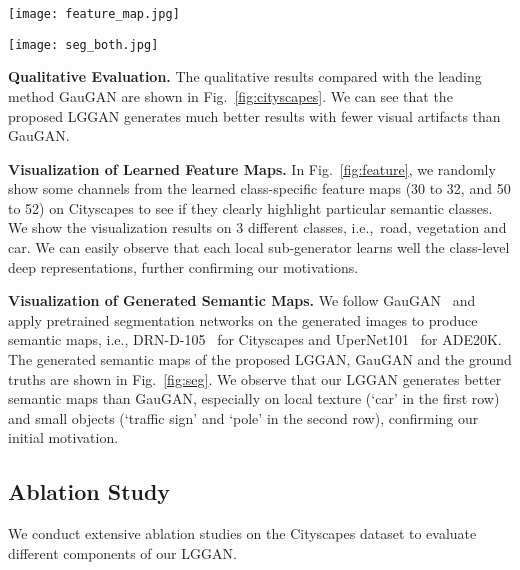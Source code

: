 \documentclass[10pt,twocolumn,letterpaper]{article}
\begin{document}
\begin{figure*}[!t] \small
	\centering
	\texttt{[image: feature\_map.jpg]}
	\caption{Visualization of learned class-specific feature maps on 3 different classes, i.e., road, vegetation and car. 
	}
	\label{fig:feature}
	\vspace{-0.4cm}
\end{figure*}

\begin{figure*}[!t] \small
	\centering
	\texttt{[image: seg\_both.jpg]}
	\caption{Visualization of generated semantic maps compared with those from GauGAN~\cite{park2019semantic} on Cityscapes. 
	}
	\label{fig:seg}
	\vspace{-0.4cm}
\end{figure*}

\noindent \textbf{Qualitative Evaluation.}
The qualitative results compared with the leading method GauGAN \cite{park2019semantic} are shown in Fig.~\ref{fig:cityscapes}.
We can see that the proposed LGGAN generates much better results with fewer visual artifacts than GauGAN.

\par\noindent\textbf{Visualization of Learned Feature Maps.}
In Fig.~\ref{fig:feature}, we randomly show some channels from the learned class-specific feature maps (30 to 32, and 50 to 52) on Cityscapes to see if they clearly highlight particular semantic classes.
We show the visualization results on 3 different classes, i.e.,~road, vegetation and car.
We can easily observe that each local sub-generator learns well the class-level deep representations, further confirming our motivations.

\par\noindent \textbf{Visualization of Generated Semantic Maps.}
We follow GauGAN~\cite{park2019semantic} and apply pretrained segmentation networks on the generated images to produce semantic maps, i.e., DRN-D-105~\cite{yu2017dilated} for Cityscapes and UperNet101~\cite{xiao2018unified} for ADE20K.
The generated semantic maps of the proposed LGGAN, GauGAN and the ground truths are shown in Fig.~\ref{fig:seg}.
We observe that our LGGAN generates better semantic maps than GauGAN, especially on local texture (`car' in the first row) and small objects (`traffic sign' and `pole' in the second row), confirming our initial motivation.

\subsection{Ablation Study}
We conduct extensive ablation studies on the Cityscapes dataset to evaluate different components of our LGGAN.
\end{document}
